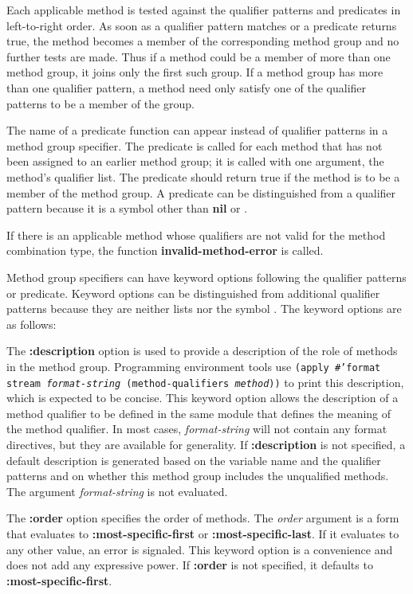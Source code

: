 Each applicable method is tested against the qualifier patterns and
predicates in left-to-right order.  As soon as a qualifier pattern matches
or a predicate returns true, the method becomes a member of the
corresponding method group and no further tests are made.  Thus if a method
could be a member of more than one method group, it joins only the first
such group.  If a method group has more than one qualifier pattern, a
method need only satisfy one of the qualifier patterns to be a member of
the group.

The name of a predicate function can appear instead of qualifier
patterns in a method group specifier.  The predicate is called for
each method that has not been assigned to an earlier method group; it
is called with one argument, the method's qualifier list.  The
predicate should return true if the method is to be a member of the
method group.  A predicate can be distinguished from a qualifier pattern
because it is a symbol other than {\bf nil} or {\bf *}.

If there is an applicable method whose qualifiers are not valid
for the method combination type, the function {\bf invalid-method-error}
is called.

Method group specifiers can have keyword options following the
qualifier patterns or predicate.  Keyword options can be distinguished from
additional qualifier patterns because they are neither lists nor the symbol
{\bf *}.  The keyword options are as follows:

\beginlist

\item{\bull}
The {\bf :description} option is used to provide a description of the
role of methods in the method group.  Programming environment tools
use {\tt (apply \#'format stream {\it format-string\/}
(method-qualifiers {\it method\/}))} to print this description, which
is expected to be concise.  This keyword
option allows the description of a method qualifier to be defined in
the same module that defines the meaning of the method
qualifier.  In most cases, {\it format-string\/} will not contain any
format directives, but they are available for generality.  If {\bf
:description} is not specified, a default description is generated
based on the variable name and the qualifier patterns and on whether
this method group includes the unqualified methods.  The argument {\it
format-string\/} is not evaluated.

\item{\bull}
The {\bf :order} option specifies the order of methods.  The {\it
order\/} argument is a form that evaluates to {\bf
:most-specific-first} or {\bf :most-specific-last}.  If it evaluates
to any other value, an error is signaled.  This keyword option is a
convenience and does not add any expressive power.
If {\bf :order} is not specified, it defaults to {\bf :most-specific-first}.

